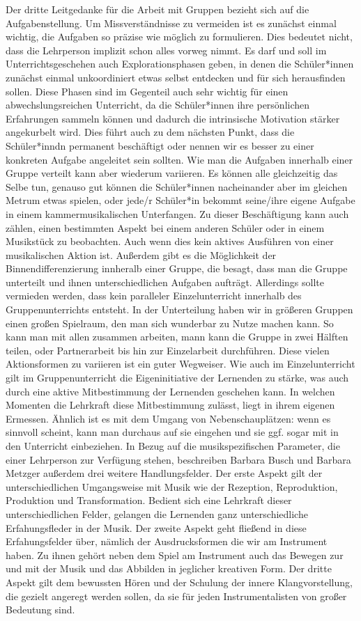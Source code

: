 Der dritte Leitgedanke für die Arbeit mit Gruppen bezieht sich auf die
Aufgabenstellung. Um Missverständnisse zu vermeiden ist es zunächst einmal
wichtig, die Aufgaben so präzise wie möglich zu formulieren. Dies bedeutet
nicht, dass die Lehrperson implizit schon alles vorweg nimmt. Es darf und soll
im Unterrichtsgeschehen auch Explorationsphasen geben, in denen die
Schüler*innen zunächst einmal unkoordiniert etwas selbst entdecken und für sich
herausfinden sollen. Diese Phasen sind im Gegenteil auch sehr wichtig für einen
abwechslungsreichen Unterricht, da die Schüler*innen ihre persönlichen
Erfahrungen sammeln können und dadurch die intrinsische Motivation stärker
angekurbelt wird. Dies führt auch zu dem nächsten Punkt, dass die Schüler*inndn
permanent beschäftigt oder nennen wir es besser zu einer konkreten Aufgabe
angeleitet sein sollten. Wie man die Aufgaben innerhalb einer Gruppe verteilt
kann aber wiederum variieren. Es können alle gleichzeitig das Selbe tun, genauso
gut können die Schüler*innen nacheinander aber im gleichen Metrum etwas spielen,
oder jede/r Schüler*in bekommt seine/ihre eigene Aufgabe in einem
kammermusikalischen Unterfangen. Zu dieser Beschäftigung kann auch zählen, einen
bestimmten Aspekt bei einem anderen Schüler oder in einem Musikstück zu
beobachten. Auch wenn dies kein aktives Ausführen von einer musikalischen Aktion
ist. Außerdem gibt es die Möglichkeit der Binnendifferenzierung innheralb einer
Gruppe, die besagt, dass man die Gruppe unterteilt und ihnen unterschiedlichen
Aufgaben aufträgt. Allerdings sollte vermieden werden, dass kein paralleler
Einzelunterricht innerhalb des Gruppenunterrichts entsteht. In der Unterteilung
haben wir in größeren Gruppen einen großen Spielraum, den man sich wunderbar zu
Nutze machen kann. So kann man mit allen zusammen arbeiten, mann kann die Gruppe
in zwei Hälften teilen, oder Partnerarbeit bis hin zur Einzelarbeit durchführen.
Diese vielen Aktionsformen zu variieren ist ein guter Wegweiser. Wie auch im
Einzelunterricht gilt im Gruppenunterricht die Eigeninitiative der Lernenden zu
stärke, was auch durch eine aktive Mitbestimmung der Lernenden geschehen kann.
In welchen Momenten die Lehrkraft diese Mitbestimmung zulässt, liegt in ihrem
eigenen Ermessen. Ähnlich ist es mit dem Umgang von Nebenschauplätzen: wenn es
sinnvoll scheint, kann man durchaus auf sie eingehen und sie ggf. sogar mit in
den Unterricht einbeziehen. In Bezug auf die musikspezifischen Parameter, die
einer Lehrperson zur Verfügung stehen, beschreiben Barbara Busch und Barbara
Metzger außerdem drei weitere Handlungsfelder. Der erste Aspekt gilt der
unterschiedlichen Umgangsweise mit Musik wie der Rezeption, Reproduktion,
Produktion und Transformation. Bedient sich eine Lehrkraft dieser
unterschiedlichen Felder, gelangen die Lernenden ganz unterschiedliche
Erfahungsfleder in der Musik. Der zweite Aspekt geht fließend in diese
Erfahungsfelder über, nämlich der Ausdrucksformen die wir am Instrument haben.
Zu ihnen gehört neben dem Spiel am Instrument auch das Bewegen zur und mit der
Musik und das Abbilden in jeglicher kreativen Form. Der dritte Aspekt gilt dem
bewussten Hören und der Schulung der innere Klangvorstellung, die gezielt
angeregt werden sollen, da sie für jeden Instrumentalisten von großer Bedeutung
sind.

